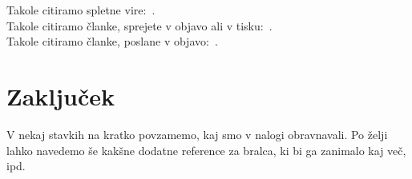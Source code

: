 \documentclass[12pt,a4paper,titlepage,openany]{report}
\begin{document}
Takole citiramo spletne vire:~\cite{splet1,splet2,splet3}.\\
Takole citiramo članke, sprejete v objavo ali v tisku:~\cite{Novak,Novak2,Novak3,Novak4}.\\
Takole citiramo članke, poslane v objavo:~\cite{Novak5,Novak6}.

\chapter{Zaključek}
\thispagestyle{fancy}

V nekaj stavkih na kratko povzamemo, kaj smo v nalogi obravnavali.
Po želji lahko navedemo še kakšne dodatne reference za bralca, ki bi ga zanimalo kaj več, ipd.


\end{document}
